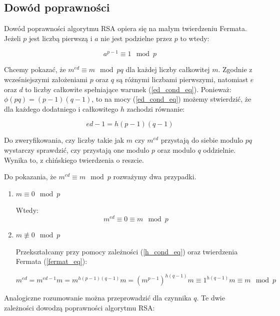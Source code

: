 \documentclass[10pt,a4paper]{article}
\begin{document}
\subsection{Dowód poprawności}
Dowód poprawności algorytmu RSA opiera się na małym twierdzeniu Fermata. Jeżeli $p$ jest liczbą pierwszą i $a$ nie jest podzielne przez $p$ to wtedy:

\begin{equation} \label{fermat_eq}
a^{p-1} \equiv 1 \mod p
\end{equation}

Chcemy pokazać, że $m^{ed} \equiv m \mod pq$ dla każdej liczby całkowitej $m$. Zgodnie z wcześniejszymi założeniami $p$ oraz $q$ są różnymi liczbami pierwszymi, natomiast $e$ oraz $d$ to liczby całkowite spełniające warunek (\ref{ed_cond_eq}).
Ponieważ: $\phi(pq) = (p-1)(q-1)$, to na mocy (\ref{ed_cond_eq}) możemy stwierdzić, że dla każdego dodatniego i całkowitego $h$ zachodzi równanie:

\begin{equation}  \label{h_cond_eq}
ed-1=h(p-1)(q-1)
\end{equation}

Do zweryfikowania, czy liczby takie jak $m$ czy $m^{ed}$ przystają do siebie modulo $pq$ wystarczy sprawdzić, czy przystają one modulo $p$ oraz modulo $q$ oddzielnie. Wynika to, z chińskiego twierdzenia o reszcie.

Do pokazania, że $m^{ed} \equiv m \mod p$ rozważymy dwa przypadki. 

\begin{enumerate}
\item $m \equiv 0 \mod p$

Wtedy:
\begin{equation} 
m^{ed} \equiv 0 \equiv m \mod p
\end{equation}

\item $m \not\equiv 0 \mod p$

Przekształcamy przy pomocy zależności (\ref{h_cond_eq}) oraz twierdzenia Fermata (\ref{fermat_eq}):

\begin{equation} 
m^{ed} = m^{ed-1}m = m^{h(p-1)(q-1)}m = (m^{p-1})^{h(q-1)}m \equiv 1^{h(q-1)}m \equiv m \mod p
\end{equation}

\end{enumerate}

Analogiczne rozumowanie można przeprowadzić dla czynnika $q$. Te dwie zależności dowodzą poprawności algorytmu RSA:
\end{document}
